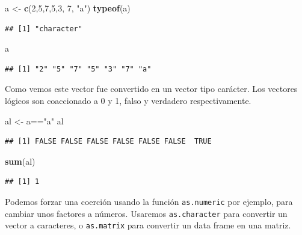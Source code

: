 \documentclass[]{article}
\newenvironment{Shaded}{\begin{snugshade}}{\end{snugshade}}
\newcommand{\KeywordTok}[1]{\textcolor[rgb]{0.13,0.29,0.53}{\textbf{{#1}}}}
\newcommand{\DecValTok}[1]{\textcolor[rgb]{0.00,0.00,0.81}{{#1}}}
\newcommand{\StringTok}[1]{\textcolor[rgb]{0.31,0.60,0.02}{{#1}}}
\newcommand{\NormalTok}[1]{{#1}}
\begin{document}
\begin{Shaded}
\begin{Highlighting}[]
\NormalTok{a <-}\StringTok{ }\KeywordTok{c}\NormalTok{(}\DecValTok{2}\NormalTok{,}\DecValTok{5}\NormalTok{,}\DecValTok{7}\NormalTok{,}\DecValTok{5}\NormalTok{,}\DecValTok{3}\NormalTok{, }\DecValTok{7}\NormalTok{, }\StringTok{"a"}\NormalTok{)}
\KeywordTok{typeof}\NormalTok{(a)}
\end{Highlighting}
\end{Shaded}

\begin{verbatim}
## [1] "character"
\end{verbatim}

\begin{Shaded}
\begin{Highlighting}[]
\NormalTok{a}
\end{Highlighting}
\end{Shaded}

\begin{verbatim}
## [1] "2" "5" "7" "5" "3" "7" "a"
\end{verbatim}

Como vemos este vector fue convertido en un vector tipo carácter. Los
vectores lógicos son coaccionado a 0 y 1, falso y verdadero
respectivamente.

\begin{Shaded}
\begin{Highlighting}[]
\NormalTok{al <-}\StringTok{ }\NormalTok{a==}\StringTok{"a"}
\NormalTok{al}
\end{Highlighting}
\end{Shaded}

\begin{verbatim}
## [1] FALSE FALSE FALSE FALSE FALSE FALSE  TRUE
\end{verbatim}

\begin{Shaded}
\begin{Highlighting}[]
\KeywordTok{sum}\NormalTok{(al)}
\end{Highlighting}
\end{Shaded}

\begin{verbatim}
## [1] 1
\end{verbatim}

Podemos forzar una coerción usando la función \texttt{as.numeric} por
ejemplo, para cambiar unos factores a números. Usaremos
\texttt{as.character} para convertir un vector a caracteres, o
\texttt{as.matrix} para convertir un data frame en una matriz.
\end{document}
